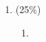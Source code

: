 \documentclass[11pt]{article}
\begin{document}
\begin{enumerate}
\item (25\%)
\begin{enumerate}
\item
\end{enumerate}
\end{enumerate}
\end{document}

